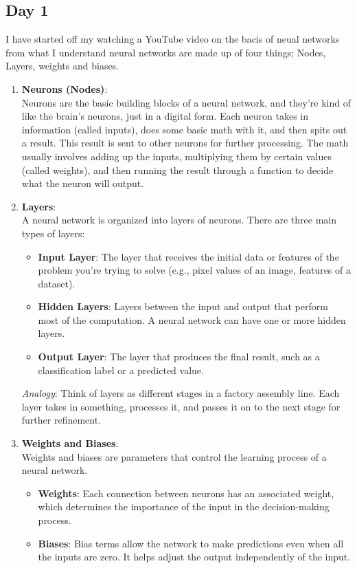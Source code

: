 \documentclass[12pt]{article}
\begin{document}
\subsection{Day 1}
I have started off my watching a YouTube video on the bacis of neual networks from what I understand neural networks are made up of four things; Nodes, Layers, weights and biases.

\begin{enumerate}
    \item \textbf{Neurons (Nodes)}: \\
    Neurons are the basic building blocks of a neural network, and they’re kind of like the brain’s neurons, just in a digital form. Each neuron takes in information (called inputs), does some basic math with it, and then spits out a result. This result is sent to other neurons for further processing. The math usually involves adding up the inputs, 
    multiplying them by certain values (called weights), and then running the result through a function to decide what the neuron will output.

    \item \textbf{Layers}: \\
    A neural network is organized into layers of neurons. There are three main types of layers:
    \begin{itemize}
        \item \textbf{Input Layer}: The layer that receives the initial data or features of the problem you're trying to solve (e.g., pixel values of an image, features of a dataset).
        \item \textbf{Hidden Layers}: Layers between the input and output that perform most of the computation. A neural network can have one or more hidden layers.
        \item \textbf{Output Layer}: The layer that produces the final result, such as a classification label or a predicted value.
    \end{itemize}
    
    \textit{Analogy}: Think of layers as different stages in a factory assembly line. Each layer takes in something, processes it, and passes it on to the next stage for further refinement.

    \item \textbf{Weights and Biases}: \\
    Weights and biases are parameters that control the learning process of a neural network.
    \begin{itemize}
        \item \textbf{Weights}: Each connection between neurons has an associated weight, which determines the importance of the input in the decision-making process.
        \item \textbf{Biases}: Bias terms allow the network to make predictions even when all the inputs are zero. It helps adjust the output independently of the input.
    \end{itemize}
    

\end{enumerate}
\end{document}

